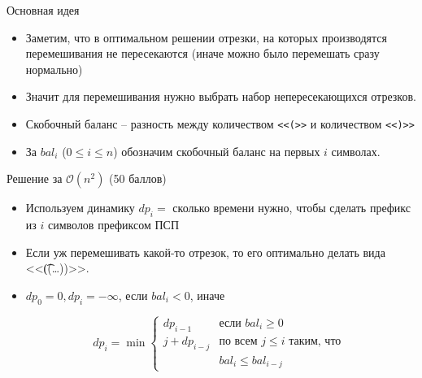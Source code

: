 \begin{frame}{Основная идея}
  \begin{itemize}
  \item Заметим, что в оптимальном решении отрезки, на которых производятся перемешивания не пересекаются (иначе можно было перемешать сразу нормально)
  \item Значит для перемешивания нужно выбрать набор непересекающихся отрезков.
    \bigskip
  \item Скобочный баланс -- разность между количеством \texttt{<<(>>} и количеством \texttt{<<)>>}
  \item За $bal_i$ ($0 \le i \le n$) обозначим скобочный баланс на первых $i$ символах.
  \end{itemize}
\end{frame}

\begin{frame}{Решение за $\mathcal{O}(n^2)$ (50 баллов)}
  \begin{itemize}
  \item Используем динамику $dp_i=$ сколько времени нужно, чтобы сделать префикс из $i$ символов префиксом ПСП
  \item Если уж перемешивать какой-то отрезок, то его оптимально делать вида <<\t{((\ldots))}>>.
  \item $dp_0 = 0, dp_i = -\infty$, если $bal_i < 0$, иначе

    \[ dp_i = \min \left\{
    \begin{array}{ll}
      dp_{i-1} & \textrm{если } bal_i \geq 0 \\
      j + dp_{i-j} & \textrm{по всем } j \leq i \textrm{ таким, что } \\
      & bal_i \leq bal_{i-j}
    \end{array} \right. \]
  \end{itemize}
\end{frame}

